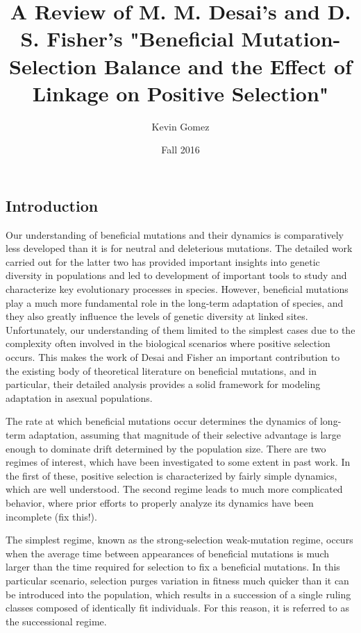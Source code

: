 \documentclass[12pt]{article}
\title{A Review of M. M. Desai's and D. S. Fisher's "Beneficial Mutation-Selection Balance and the Effect of Linkage on Positive Selection"}
\date{Fall 2016}
\author{Kevin Gomez}
\begin{document}
\maketitle
\newpage


\newpage
\subsection*{Introduction}
Our understanding of beneficial mutations and their dynamics is comparatively less developed than it is for neutral and deleterious mutations.  The detailed work carried out for the latter two has provided important insights into genetic diversity in populations and led to development of important tools to study and characterize key evolutionary processes in species.  However, beneficial mutations play a much more fundamental role in the long-term adaptation of species, and they also greatly influence the levels of genetic diversity at linked sites.  Unfortunately, our understanding of them limited to the simplest cases due to the complexity often involved in the biological scenarios where positive selection occurs.  This makes the work of Desai and Fisher an important contribution to the existing body of theoretical literature on beneficial mutations, and in particular, their detailed analysis provides a solid framework for modeling adaptation in asexual populations.  

The rate at which beneficial mutations occur determines the dynamics of long-term adaptation, assuming that magnitude of their selective advantage is large enough to dominate drift determined by the population size.  There are two regimes of interest, which have been investigated to some extent in past work.  In the first of these, positive selection is characterized by fairly simple dynamics, which are well understood.  The second regime leads to much more complicated behavior, where prior efforts to properly analyze its dynamics have been incomplete (fix this!).        

The simplest regime, known as the strong-selection weak-mutation regime, occurs when the average time between appearances of beneficial mutations is much larger than the time required for selection to fix a beneficial mutations.  In this particular scenario, selection purges variation in fitness much quicker than it can be introduced into the population, which results in a succession of a single ruling classes composed of identically fit individuals.  For this reason, it is referred to as the successional regime.  
\end{document}
